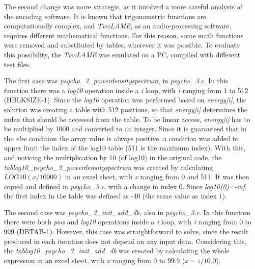 \documentclass{article}
\begin{document}
The second change was more strategic, as it involved a more careful analysis of the encoding software. It is known that trigonometric functions are computationally complex, and \textit{TwoLAME}, as an audio-processing software, requires different mathematical functions. For this reason, some math functions were removed and substituted by tables, wherever it was possible. To evaluate this possibility, the \textit{TwoLAME} was emulated on a PC, compiled with different test files.

The first case was \textit{psycho\_3\_powerdensityspectrum}, in \textit{psycho\_3.c}. In this function there was a \textit{log10} operation inside a \textit{i} loop, with \textit{i} ranging from 1 to 512 (HBLKSIZE-1). Since the \textit{log10} operation was performed based on \textit{energy[i]}, the solution was creating a table with 512 positions, so that \textit{energy[i]} determines the index that should be accessed from the table. To be linear access, \textit{energy[i]} has to be multiplied by 1000 and converted to an integer. Since it is guaranteed that in the \textit{else} condition the array value is always positive, a condition was added to upper limit the index of the log10 table (511 is the maximum index). With this, and noticing the multiplication by 10 (of log10) in the original code, the \textit{tablog10\_psycho\_3\_powerdensityspectrum} was created by calculating $LOG10(x/10000)$ in an excel sheet, with \textit{x} ranging from 0 and 511. It was then copied and defined in \textit{psycho\_3.c}, with a change in index 0. Since \textit{log10(0)=-inf}, the first index in the table was defined as -40 (the same value as index 1).

\begin{comment}
\begin{figure}[H]
\centerline{\fbox{\texttt{[image: powerdensityspectrum.pdf]}}}
\caption{\textit{psycho\_3\_powerdensityspectrum} function.}
\label{powerdensityspectrum}
\end{figure}
\end{comment}


The second case was \textit{psycho\_3\_init\_add\_db}, also in \textit{psycho\_3.c}. In this function there were both \textit{pow} and \textit{log10} operations inside a \textit{i} loop, with \textit{i} ranging from 0 to 999 (DBTAB-1). However, this case was straightforward to solve, since the result produced in each iteration does not depend on any input data. Considering this, the \textit{tablog10\_psycho\_3\_init\_add\_db} was created by calculating the whole expression in an excel sheet, with \textit{x} ranging from 0 to 99.9 ($x=i/10.0$).
\end{document}

